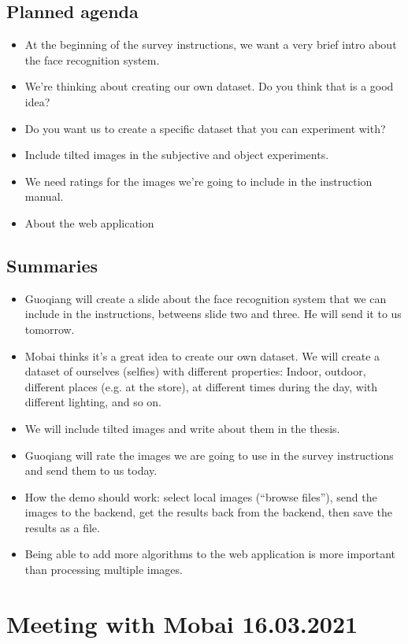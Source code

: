 \subsection*{Planned agenda}
\begin{itemize}
    \item At the beginning of the survey instructions, we want a very brief intro about the face recognition system.
    \item We’re thinking about creating our own dataset. Do you think that is a good idea?
    \item Do you want us to create a specific dataset that you can experiment with?
    \item Include tilted images in the subjective and object experiments.
    \item We need ratings for the images we’re going to include in the instruction manual.
    \item About the web application
\end{itemize}

\subsection*{Summaries}
\begin{itemize}
    \item Guoqiang will create a slide about the face recognition system that we can include in the instructions, betweens slide two and three. He will send it to us tomorrow.
    \item Mobai thinks it's a great idea to create our own dataset. We will create a dataset of ourselves (selfies) with different properties: Indoor, outdoor, different places (e.g. at the store), at different times during the day, with different lighting, and so on.
    \item We will include tilted images and write about them in the thesis.
    \item Guoqiang will rate the images we are going to use in the survey instructions and send them to us today.
    \item How the demo should work: select local images (“browse files”), send the images to the backend, get the results back from the backend, then save the results as a file.
    \item Being able to add more algorithms to the web application is more important than processing multiple images.
\end{itemize}


\section*{Meeting with Mobai 16.03.2021}
